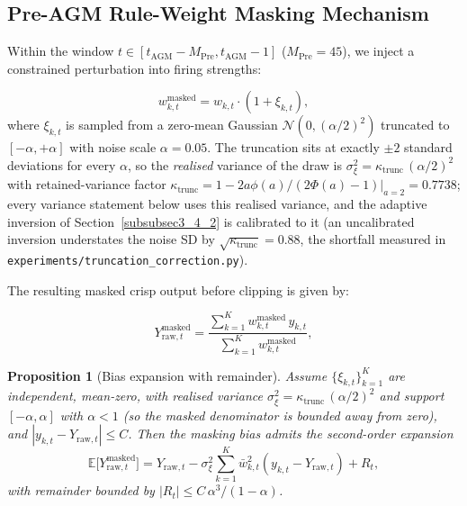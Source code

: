 \documentclass[pdflatex,sn-mathphys-num]{sn-jnl}
\theoremstyle{thmstyleone}
\newtheorem{proposition}[theorem]{Proposition}
\theoremstyle{thmstyletwo}
\theoremstyle{thmstylethree}
\begin{document}
\subsection{Pre-AGM Rule-Weight Masking Mechanism}\label{subsec3_4}

Within the window $t \in [t_{\mathrm{AGM}} - M_{\mathrm{Pre}}, t_{\mathrm{AGM}} - 1]$ ($M_{\mathrm{Pre}} = 45$), we inject a constrained perturbation into firing strengths:

\begin{equation}
    w_{k,t}^{\text{masked}} = w_{k,t} \cdot (1 + \xi_{k,t}),
    \label{eq:masked_weight}
\end{equation}
where $\xi_{k,t}$ is sampled from a zero-mean Gaussian $\mathcal{N}\!\left(0, (\alpha/2)^2\right)$ truncated to $[-\alpha, +\alpha]$ with noise scale $\alpha = 0.05$. The truncation sits at exactly $\pm 2$ standard deviations for every $\alpha$, so the \emph{realised} variance of the draw is $\sigma_\xi^2 = \kappa_{\mathrm{trunc}}\,(\alpha/2)^2$ with retained-variance factor $\kappa_{\mathrm{trunc}} = 1 - 2a\phi(a)/(2\Phi(a)-1)\big|_{a=2} = 0.7738$; every variance statement below uses this realised variance, and the adaptive inversion of Section~\ref{subsubsec3_4_2} is calibrated to it (an uncalibrated inversion understates the noise SD by $\sqrt{\kappa_{\mathrm{trunc}}} = 0.88$, the shortfall measured in \texttt{experiments/truncation\_correction.py}).

The resulting masked crisp output before clipping is given by:

\begin{equation}
    Y_{\mathrm{raw},t}^{\text{masked}} = \frac{\sum_{k=1}^{K} w_{k,t}^{\text{masked}} \, y_{k,t}}{\sum_{k=1}^{K} w_{k,t}^{\text{masked}}},
    \label{eq:defuzz_masked}
\end{equation}

\begin{proposition}[Bias expansion with remainder]\label{prop:bias}
Assume $\{\xi_{k,t}\}_{k=1}^K$ are independent, mean-zero, with realised variance $\sigma_\xi^2 = \kappa_{\mathrm{trunc}}\,(\alpha/2)^2$ and support $[-\alpha, \alpha]$ with $\alpha < 1$ (so the masked denominator is bounded away from zero), and $|y_{k,t} - Y_{\mathrm{raw},t}| \le C$. Then the masking bias admits the second-order expansion
\begin{equation}
    \mathbb{E}\bigl[Y_{\mathrm{raw},t}^{\text{masked}}\bigr] = Y_{\mathrm{raw},t} - \sigma_\xi^2 \sum_{k=1}^{K} \bar{w}_{k,t}^2 \left( y_{k,t} - Y_{\mathrm{raw},t} \right) + R_t,
    \label{eq:bias_expansion}
\end{equation}
with remainder bounded by $|R_t| \le C\,\alpha^3/(1-\alpha)$.
\end{proposition}
\end{document}
